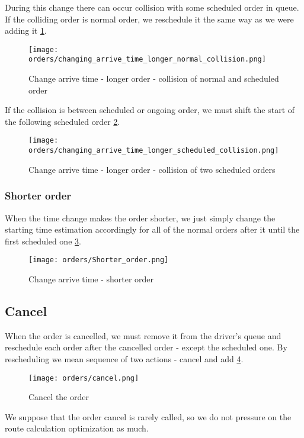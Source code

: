 	During this change there can occur collision with some scheduled order in queue. If the colliding order is normal order, we reschedule it the same way as we were adding it \ref{order-process-change_collision_normal}. 
	
	\begin{figure}[h]\centering
		\texttt{[image: orders/changing\_arrive\_time\_longer\_normal\_collision.png]}
		\caption{Change arrive time - longer order - collision of normal and scheduled order} 
		\label{order-process-change_collision_normal}
	\end{figure} 

	If the collision is between scheduled or ongoing order, we must shift the start of the following scheduled order \ref{order-process-change_collision_scheduled}.
	
	\begin{figure}[h]\centering
		\texttt{[image: orders/changing\_arrive\_time\_longer\_scheduled\_collision.png]}
		\caption{Change arrive time - longer order - collision of two scheduled orders} 
		\label{order-process-change_collision_scheduled}
	\end{figure} 
	
	
	\subsubsection{Shorter order}
		When the time change makes the order shorter, we just simply change the starting time estimation accordingly for all of the normal orders after it until the first scheduled one
		\ref{order-process-change-shorter}.
		
		\begin{figure}[h]\centering
			\texttt{[image: orders/Shorter\_order.png]}
			\caption{Change arrive time - shorter order} 
			\label{order-process-change-shorter}
		\end{figure} 
	
\subsection{Cancel}
	When the order is cancelled, we must remove it from the driver's queue and reschedule each order after the cancelled order - except the scheduled one. By rescheduling we mean sequence of two actions - cancel and add \ref{order-process-cancel}.
	
	\begin{figure}[h]\centering
		\texttt{[image: orders/cancel.png]}
		\caption{Cancel the order} 
		\label{order-process-cancel}
	\end{figure} 
	We suppose that the order cancel is rarely called, so we do not pressure on the route calculation optimization as much.

